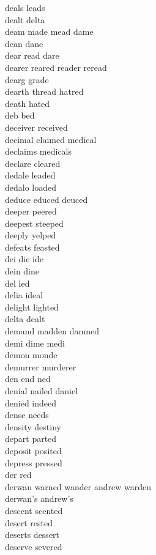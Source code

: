 deals leads\\
dealt delta\\
deam made mead dame\\
dean dane\\
dear read dare\\
dearer reared reader reread\\
dearg grade\\
dearth thread hatred\\
death hated\\
deb bed\\
deceiver received\\
decimal claimed medical\\
declaims medicals\\
declare cleared\\
dedale leaded\\
dedalo loaded\\
deduce educed deuced\\
deeper peered\\
deepest steeped\\
deeply yelped\\
defeats feasted\\
dei die ide\\
dein dine\\
del led\\
delia ideal\\
delight lighted\\
delta dealt\\
demand madden damned\\
demi dime medi\\
demon monde\\
demurrer murderer\\
den end ned\\
denial nailed daniel\\
denied indeed\\
dense needs\\
density destiny\\
depart parted\\
deposit posited\\
depress pressed\\
der red\\
derwan warned wander andrew warden\\
derwan's andrew's\\
descent scented\\
desert rested\\
deserts dessert\\
deserve severed\\
